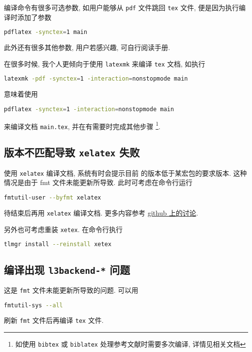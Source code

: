 编译命令有很多可选参数, 如用户能够从 \texttt{pdf} 文件跳回 \texttt{tex} 文件,
便是因为执行编译时添加了参数
\begin{lstlisting}[language=bash]
  pdflatex -synctex=1 main
\end{lstlisting}
此外还有很多其他参数, 用户若感兴趣, 可自行阅读手册. 

在很多时候, 我个人更倾向于使用 \texttt{latexmk} 来编译 \texttt{tex} 文档,
如执行
\begin{lstlisting}[language=bash]
  latexmk -pdf -synctex=1 -interaction=nonstopmode main
\end{lstlisting}
意味着使用 
\begin{lstlisting}[language=bash]
  pdflatex -synctex=1 -interaction=nonstopmode main
\end{lstlisting}
来编译文档 \texttt{main.tex}, 并在有需要时完成其他步骤%
\footnote{如使用 \texttt{bibtex} 或 \texttt{biblatex} 处理参考文献时需要多次编译,
详情见相关文档}. 

\subsection{\LaTeXe 版本不匹配导致 \texttt{xelatex} 失败}

使用 \texttt{xelatex} 编译文档,
系统有时会提示目前 \LaTeXe 的版本低于某宏包的要求版本.
这种情况是由于 \textsf{fmt} 文件未能更新所导致.
此时可考虑在命令行运行
\begin{lstlisting}[language=bash]
  fmtutil-user --byfmt xelatex
\end{lstlisting}
待结束后再用 \texttt{xelatex} 编译文档.
更多内容参考
\href{https://github.com/CTeX-org/forum/issues/70}{github 上的讨论}.

另外也可考虑重装 \texttt{xetex}.
在命令行执行
\begin{lstlisting}[language=bash]
  tlmgr install --reinstall xetex
\end{lstlisting}

\subsection{编译出现 \texttt{l3backend-*} 问题}

这是 \texttt{fmt} 文件未能更新所导致的问题.
可以用
\begin{lstlisting}[language=bash]
  fmtutil-sys --all
\end{lstlisting}
刷新 \texttt{fmt} 文件后再编译 \texttt{tex} 文件.